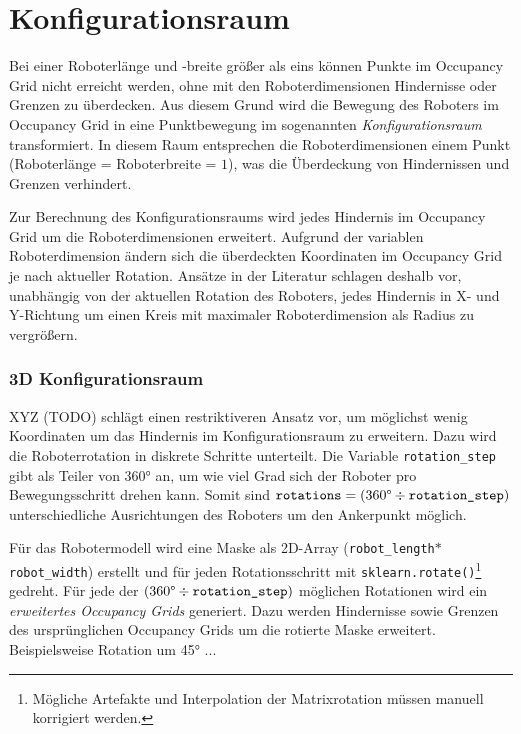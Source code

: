 \chapter{Konfigurationsraum}


Bei einer Roboterlänge und -breite größer als eins können Punkte im Occupancy Grid nicht erreicht werden, ohne mit den Roboterdimensionen Hindernisse oder Grenzen zu überdecken. 
Aus diesem Grund wird die Bewegung des Roboters im Occupancy Grid in eine Punktbewegung im sogenannten \textit{Konfigurationsraum} transformiert.
In diesem Raum entsprechen die Roboterdimensionen einem Punkt (Roboterlänge = Roboterbreite = $1$), was die Überdeckung von Hindernissen und Grenzen verhindert.

Zur Berechnung des Konfigurationsraums wird jedes Hindernis im Occupancy Grid um die Roboterdimensionen erweitert.
Aufgrund der variablen Roboterdimension ändern sich die überdeckten Koordinaten im Occupancy Grid je nach aktueller Rotation.
Ansätze in der Literatur schlagen deshalb vor, unabhängig von der aktuellen Rotation des Roboters, jedes Hindernis in X- und Y-Richtung um einen Kreis mit maximaler Roboterdimension als Radius zu vergrößern.

\subsection*{3D Konfigurationsraum}

XYZ (TODO) schlägt einen restriktiveren Ansatz vor, um möglichst wenig Koordinaten um das Hindernis im Konfigurationsraum zu erweitern.
Dazu wird die Roboterrotation in diskrete Schritte unterteilt. Die Variable \texttt{rotation\_step} gibt als Teiler von 360° an, um wie viel Grad sich der Roboter pro Bewegungsschritt drehen kann.
Somit sind $\texttt{rotations} = (360 \text{\textdegree} \div \texttt{rotation\_step})$ unterschiedliche Ausrichtungen des Roboters um den Ankerpunkt möglich.

Für das Robotermodell wird eine Maske als 2D-Array (\texttt{robot\_length}$*$\texttt{robot\_width}) erstellt und für jeden Rotationsschritt mit \texttt{sklearn.rotate()}\footnote{Mögliche Artefakte und Interpolation der Matrixrotation müssen manuell korrigiert werden.} gedreht.
Für jede der $(360 \text{\textdegree} \div \texttt{rotation\_step})$ möglichen Rotationen wird ein \textit{erweitertes Occupancy Grids} generiert. Dazu werden Hindernisse sowie Grenzen des ursprünglichen Occupancy Grids um die rotierte Maske erweitert.
Beispielsweise Rotation um 45° ...

